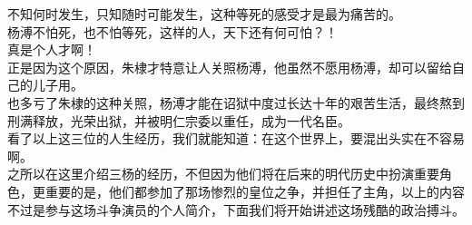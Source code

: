 \begin{multicols}{\theparacolNo}
不知何时发生，只知随时可能发生，这种等死的感受才是最为痛苦的。\\

杨溥不怕死，也不怕等死，这样的人，天下还有何可怕？！\\

真是个人才啊！\\

正是因为这个原因，朱棣才特意让人关照杨溥，他虽然不愿用杨溥，却可以留给自己的儿子用。\\

也多亏了朱棣的这种关照，杨溥才能在诏狱中度过长达十年的艰苦生活，最终熬到刑满释放，光荣出狱，并被明仁宗委以重任，成为一代名臣。\\

看了以上这三位的人生经历，我们就能知道：在这个世界上，要混出头实在不容易啊。\\

之所以在这里介绍三杨的经历，不但因为他们将在后来的明代历史中扮演重要角色，更重要的是，他们都参加了那场惨烈的皇位之争，并担任了主角，以上的内容不过是参与这场斗争演员的个人简介，下面我们将开始讲述这场残酷的政治搏斗。\\
\ifnum{}
	\end{multicols}
\fi
\newpage
